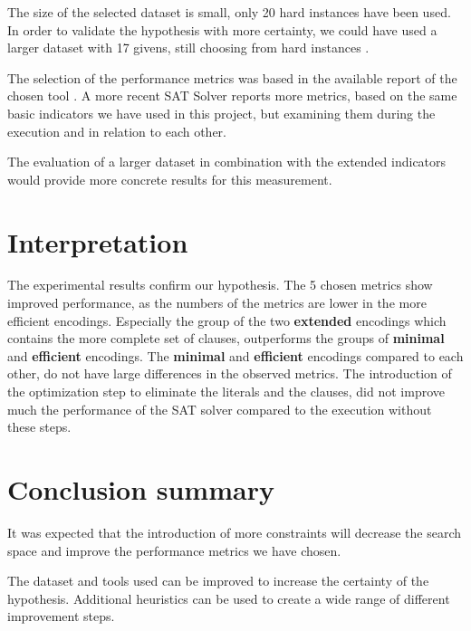 \documentclass[letterpaper]{article}
\begin{document}
The size of the selected dataset is small, only 20 hard instances have been used. In order to validate the hypothesis with more certainty, we could have used a larger dataset with 17 givens, still choosing from hard instances \cite{selman1992new} \cite{selman1996generating}.

The selection of the performance metrics was based in the available report of the chosen tool \cite{sorensson2005minisat}. A more recent SAT Solver \cite{soos2016cryptominisat} reports more metrics, based on the same basic indicators we have used in this project, but examining them during the execution and in relation to each other.

The evaluation of a larger dataset in combination with the extended indicators would provide more concrete results for this measurement.


\section{Interpretation}

The experimental results confirm our hypothesis. The 5 chosen metrics show improved performance, as the numbers of the metrics are lower in the more efficient encodings.
Especially the group of the two \textbf{extended} encodings which contains the more complete set of clauses, outperforms the groups of \textbf{minimal} and \textbf{efficient} encodings. The \textbf{minimal} and \textbf{efficient} encodings compared to each other, do not have large differences in the observed metrics.
The introduction of the optimization step to eliminate the literals and the clauses, did not improve much the performance of the SAT solver compared to the execution without these steps.

\section{Conclusion summary}

It was expected that the introduction of more constraints will decrease the search space and improve the performance metrics we have chosen.

The dataset and tools used can be improved to increase the certainty of the hypothesis. Additional heuristics can be used to create a wide range of different improvement steps.

\printbibliography
\end{document}
